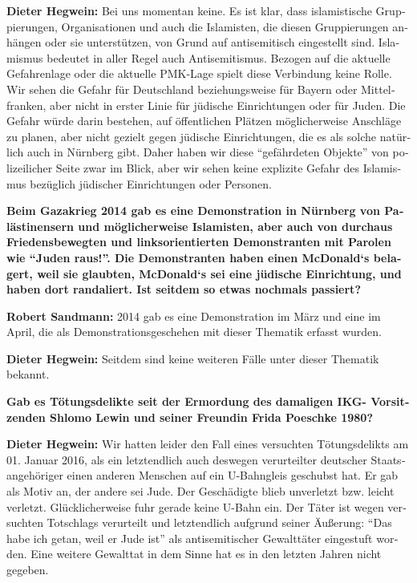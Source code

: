 \begin{otherlanguage}{ngerman}
\textbf{Dieter Hegwein:} Bei uns momentan keine. Es ist klar, dass islamistische Gruppierungen, Organisationen und auch die Islamisten, die diesen Gruppierungen anhängen oder sie unterstützen, von Grund auf antisemitisch eingestellt sind. Islamismus bedeutet in aller Regel auch Antisemitismus. Bezogen auf die aktuelle Gefahrenlage oder die aktuelle PMK-Lage spielt diese Verbindung keine Rolle. Wir sehen die Gefahr für Deutschland beziehungsweise für Bayern oder Mittelfranken, aber nicht in erster Linie für jüdische Einrichtungen oder für Juden. Die Gefahr würde darin bestehen, auf öffentlichen Plätzen möglicherweise Anschläge zu planen, aber nicht gezielt gegen jüdische Einrichtungen, die es als solche natürlich auch in Nürnberg gibt. Daher haben wir diese "`gefährdeten Objekte"' von polizeilicher Seite zwar im Blick, aber wir sehen keine explizite Gefahr des Islamismus bezüglich jüdischer Einrichtungen oder Personen.

\textbf{Beim Gazakrieg 2014 gab es eine Demonstration in Nürnberg von Palästinensern und möglicherweise Islamisten, aber auch von durchaus Friedensbewegten und linksorientierten Demonstranten mit Parolen wie "`Juden raus!"'. Die Demonstranten haben einen McDonald‘s belagert, weil sie glaubten, McDonald‘s sei eine jüdische Einrichtung, und haben dort randaliert. Ist seitdem so etwas nochmals passiert?}

\textbf{Robert Sandmann:} 2014 gab es eine Demonstration im März und eine im April, die als Demonstrationsgeschehen mit dieser Thematik erfasst wurden.

\textbf{Dieter Hegwein:} Seitdem sind keine weiteren Fälle unter dieser Thematik bekannt.

\textbf{Gab es Tötungsdelikte seit der Ermordung des damaligen IKG- Vorsitzenden Shlomo Lewin und seiner Freundin Frida Poeschke 1980?}

\textbf{Dieter Hegwein:} Wir hatten leider den Fall eines versuchten Tötungsdelikts am 01. Januar 2016, als ein letztendlich auch deswegen verurteilter deutscher Staatsangehöriger einen anderen Menschen auf ein U-Bahngleis geschubst hat. Er gab als Motiv an, der andere sei Jude. Der Geschädigte blieb unverletzt bzw. leicht verletzt. Glücklicherweise fuhr gerade keine U-Bahn ein. Der Täter ist wegen versuchten Totschlags verurteilt und letztendlich aufgrund seiner Äußerung: "`Das habe ich getan, weil er Jude ist"' als antisemitischer Gewalttäter eingestuft worden. Eine weitere Gewalttat in dem Sinne hat es in den letzten Jahren nicht gegeben. 


\end{otherlanguage}
